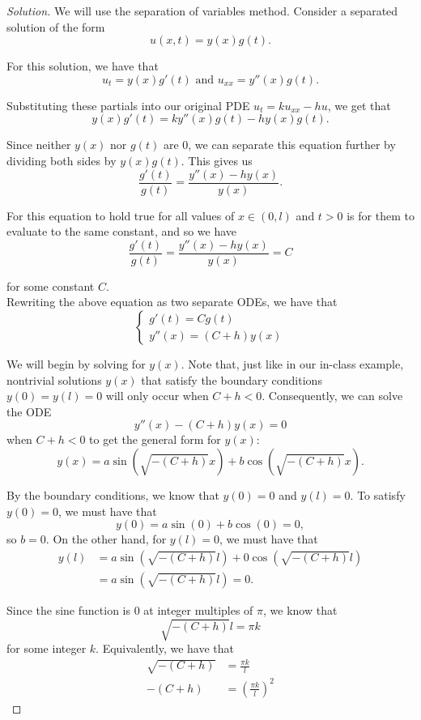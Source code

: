 \documentclass[11pt]{article}
\newenvironment{solution}
  {\renewcommand\qedsymbol{$\blacksquare$}\begin{proof}[Solution]}
  {\end{proof}}
\begin{document}
\begin{solution}
We will use the separation of variables method. Consider a separated solution of the form \[u(x, t) = y(x) g(t).\]

For this solution, we have that \[ u_t = y(x)g'(t) \text{ and } u_{xx} = y''(x) g(t).\]

Substituting these partials into our original PDE $u_t = ku_{xx} - hu$, we get that
\[ y(x)g'(t) = ky''(x)g(t) - hy(x)g(t).\]

Since neither $y(x)$ nor $g(t)$ are $0$, we can separate this equation further by dividing both sides by $y(x)g(t)$. This gives us
\[ \frac{g'(t)}{g(t)} = \frac{y''(x) -hy(x)}{y(x)}.\]

For this equation to hold true for all values of $x \in (0, l)$ and $t>0$ is for them to evaluate to the same constant, and so we have
\[ \frac{g'(t)}{g(t)} = \frac{y''(x) -hy(x)}{y(x)} = C\]

for some constant $C$. \\

Rewriting the above equation as two separate ODEs, we have that
\[
\begin{cases}
  g'(t) = Cg(t) \\
  y''(x) = (C+h)y(x)
\end{cases}
\]

We will begin by solving for $y(x).$ Note that, just like in our in-class example, nontrivial solutions $y(x)$ that satisfy the boundary conditions $y(0)=y(l) = 0$ will only occur when $C+h < 0$. Consequently, we can solve the ODE 
\[ y''(x) - (C+h)y(x) = 0\] when $C+h < 0$ to get the general form for $y(x)$: 
\[ y(x) = a\sin\left(\sqrt{-(C+h)}x\right) + b\cos\left(\sqrt{-(C+h)}x\right).\]

By the boundary conditions, we know that $y(0) = 0$ and $y(l) = 0.$ To satisfy $y(0) = 0$, we must have that
\[ y(0) = a\sin(0) + b\cos(0) = 0, \]
so $b = 0$. On the other hand, for $y(l) = 0$, we must have that
\begin{align*}y(l)&= a\sin\left(\sqrt{-(C+h)}l\right) + 0\cos\left(\sqrt{-(C+h)}l\right) \\
&= a\sin\left(\sqrt{-(C+h)}l\right) = 0.
\end{align*}

Since the sine function is $0$ at integer multiples of $\pi$, we know that \[\sqrt{-(C+h)}l = \pi k \] for some integer $k$. Equivalently, we have that 
\begin{align*}\sqrt{-(C+h)} &= \frac{\pi k}{l} \\
-(C+h) &= \left( \frac{\pi k}{l} \right)^2 \end{align*}


\end{solution}
\end{document}
